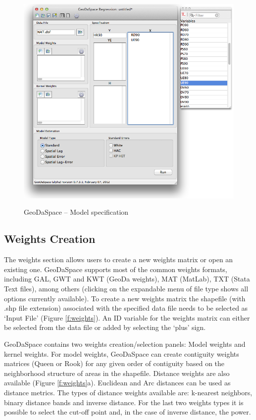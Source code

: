 \documentclass{article}
\begin{document}
\begin{figure}[htb]
\begin{center}
\includegraphics[width=0.9\linewidth]{spec.png}\\
\caption{GeoDaSpace -- Model specification}
\label{f:spec}
\end{center}
\end{figure}
\FloatBarrier

\subsection{Weights Creation}

The weights section allows users to create a new weights matrix or open an existing one. GeoDaSpace supports most of the common weights formats, including GAL, GWT and KWT (GeoDa weights), MAT (MatLab), TXT (Stata Text files), among others (clicking on the expandable menu of file type shows all options currently available). To create a new weights matrix the shapefile (with .shp file extension) associated with the specified data file needs to be selected  as `Input File' (Figure \ref{f:weights}). An ID variable for the weights matrix can either be selected from the data file or added by selecting the `plus' sign. 

GeoDaSpace contains two weights creation/selection panels: Model weights and kernel weights. For model weights, GeoDaSpace can create contiguity weights matrices (Queen or Rook) for any given order of contiguity based on the neighborhood structure of areas in the shapefile. Distance weights are also available (Figure \ref{f:weights}a). Euclidean and Arc distances can be used as distance metrics. The types of distance weights available are: k-nearest neighbors, binary distance bands and inverse distance. For the last two weights types it is possible to select the cut-off point and, in the case of inverse distance, the power. 
\end{document}
